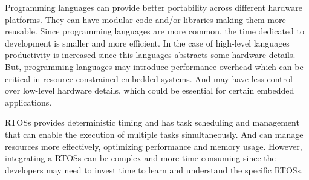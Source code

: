 Programming languages can provide better portability across different hardware platforms.
They can have modular code and/or libraries making them more reusable.
Since programming languages are more common, the time dedicated to development is smaller and more efficient.
In the case of high-level languages productivity is increased since this languages abstracts some hardware details.
But, programming languages may introduce performance overhead which can be critical in resource-constrained embedded systems.
And may have less control over low-level hardware details, which could be essential for certain embedded applications.


\glspl{RTOS} provides deterministic timing and has task scheduling and management that can enable the execution of multiple tasks simultaneously.
And can manage resources more effectively, optimizing performance and memory usage.
However, integrating a \glspl{RTOS} can be complex and more time-consuming since the developers may need to invest time to learn and understand the specific \glspl{RTOS}.






